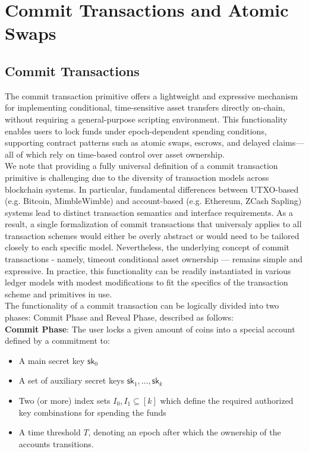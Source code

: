 
\section{Commit Transactions and Atomic Swaps}

\subsection{Commit Transactions}
The commit transaction primitive offers a lightweight and expressive mechanism for implementing conditional, time-sensitive asset transfers directly on-chain, without requiring a general-purpose scripting environment. This functionality enables users to lock funds under epoch-dependent spending conditions, supporting contract patterns such as atomic swaps, escrows, and delayed claims—all of which rely on time-based control over asset ownership. \\
We note that providing a fully universal definition of a commit transaction primitive is challenging due to the diversity of transaction models across blockchain systems. In particular, fundamental differences between UTXO-based (e.g. Bitcoin, MimbleWimble) and account-based (e.g. Ethereum, ZCash Sapling) systems lead to distinct transaction semantics and interface requirements. As a result, a single formalization of commit transactions that universaly applies to all transaction schemes would either be overly abstract or would need to be tailored closely to each specific model. Nevertheless, the underlying concept of commit transactions - namely, timeout conditional asset ownership — remains simple and expressive. In practice, this functionality can be readily instantiated in various ledger models with modest modifications to fit the specifics of the transaction scheme and primitives in use. \vspace{0.3em} \\
The functionality of a commit transaction can be logically divided into two phases: Commit Phase and Reveal Phase, described as follows: \\
\textbf{Commit Phase}: The user locks a given amount of coins into a special account defined by a commitment to:
    \begin{itemize}
        \item A main secret key $\mathsf{sk}_0$
	\item A set of auxiliary secret keys $\mathsf{sk}_1, \dots, \mathsf{sk}_k$
	\item Two (or more) index sets $I_0, I_1 \subseteq [k]$ which define the required authorized key combinations for spending the funds
	\item A time threshold $T$, denoting an epoch after which the ownership of the accounts transitions.
    \end{itemize}
